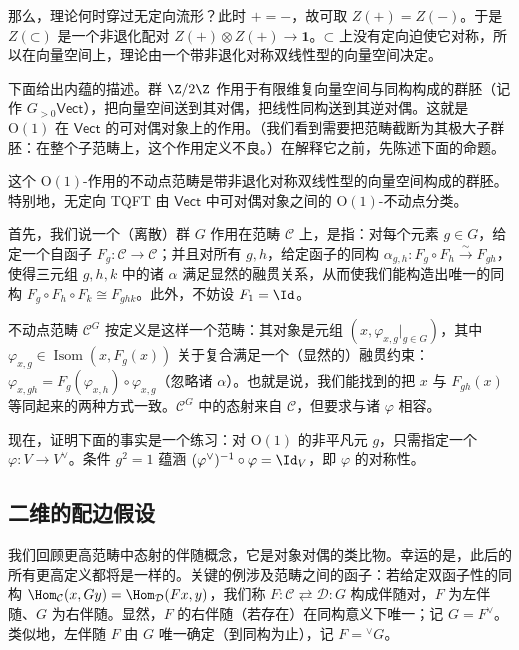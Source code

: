 那么，理论何时穿过无定向流形？此时 $+=-$，故可取 $Z(+)=Z(-)$。于是 $Z(\mathord{\subset})$ 是一个非退化配对 $Z(+)\otimes Z(+)\to\mathbf{1}$。$\mathord{\subset}$ 上没有定向迫使它对称，所以在向量空间上，理论由一个带非退化对称双线性型的向量空间决定。

下面给出内蕴的描述。群 $\Z/2\Z$ 作用于有限维复向量空间与同构构成的群胚（记作 $G_{>0}\mathsf{Vect}$），把向量空间送到其对偶，把线性同构送到其逆对偶。这就是 $\mathrm{O}(1)$ 在 $\mathsf{Vect}$ 的可对偶对象上的作用。（我们看到需要把范畴截断为其极大子群胚：在整个子范畴上，这个作用定义不良。）在解释它之前，先陈述下面的命题。

\begin{proposition}\label{prop:3.4.6}
这个 $\mathrm{O}(1)$-作用的不动点范畴是带非退化对称双线性型的向量空间构成的群胚。特别地，无定向 TQFT 由 $\mathsf{Vect}$ 中可对偶对象之间的 $\mathrm{O}(1)$-不动点分类。
\end{proposition}

首先，我们说一个（离散）群 $G$ 作用在范畴 $\mathcal{C}$ 上，是指：对每个元素 $g\in G$，给定一个自函子 $F_g\colon\mathcal{C}\to\mathcal{C}$；并且对所有 $g,h$，给定函子的同构 $\alpha_{g,h}\colon F_g\circ F_h\xrightarrow{\sim}F_{gh}$，使得三元组 $g,h,k$ 中的诸 $\alpha$ 满足显然的融贯关系，从而使我们能构造出唯一的同构 $F_g\circ F_h\circ F_k\cong F_{ghk}$。此外，不妨设 $F_1=\Id$。

不动点范畴 $\mathcal{C}^G$ 按定义是这样一个范畴：其对象是元组 $(x,\varphi_{x,g}|_{g\in G})$，其中 $\varphi_{x,g}\in\operatorname{Isom}(x,F_g(x))$ 关于复合满足一个（显然的）融贯约束：$\varphi_{x,gh}=F_g(\varphi_{x,h})\circ\varphi_{x,g}$（忽略诸 $\alpha$）。也就是说，我们能找到的把 $x$ 与 $F_{gh}(x)$ 等同起来的两种方式一致。$\mathcal{C}^G$ 中的态射来自 $\mathcal{C}$，但要求与诸 $\varphi$ 相容。

现在，证明下面的事实是一个练习：对 $\mathrm{O}(1)$ 的非平凡元 $g$，只需指定一个 $\varphi\colon V\to V^\vee$。条件 $g^2=1$ 蕴涵 $(\varphi^\vee)^{-1}\circ\varphi=\Id_V$，即 $\varphi$ 的对称性。

\subsection{二维的配边假设}

我们回顾更高范畴中态射的伴随概念，它是对象对偶的类比物。幸运的是，此后的所有更高定义都将是一样的。关键的例涉及范畴之间的函子：若给定双函子性的同构 $\Hom_{\mathcal{C}}(x,Gy)=\Hom_{\mathcal{D}}(Fx,y)$，我们称 $F\colon\mathcal{C}\rightleftarrows\mathcal{D}:G$ 构成伴随对，$F$ 为左伴随、$G$ 为右伴随。显然，$F$ 的右伴随（若存在）在同构意义下唯一；记 $G=F^\vee$。类似地，左伴随 $F$ 由 $G$ 唯一确定（到同构为止），记 $F={}^\vee G$。

